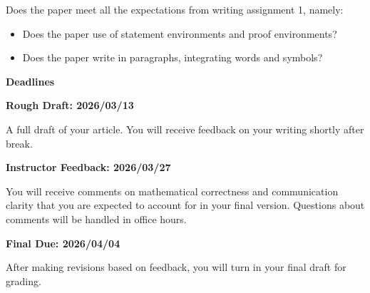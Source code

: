 \documentclass{article}
\begin{document}
\begin{itemize}
\begin{itemize}
                    Does the paper meet all the expectations
                    from writing assignment 1, namely:
                    \begin{itemize}
                        \item
                            Does the paper use of statement environments
                            and proof environments?
                        \item
                            Does the paper write in paragraphs,
                            integrating words and symbols?
                    \end{itemize}
            \end{itemize}
    \end{itemize}
    \par\hfill\par
    \textbf{\Large{Deadlines}}
    \par\hfill\par
    \textbf{Rough Draft: 2026/03/13}
    \par
    A full draft of your article.
    You will receive feedback on your writing shortly after break.
    \par\hfill\par
    \textbf{Instructor Feedback: 2026/03/27}
    \par
    You will receive comments on mathematical correctness and
    communication clarity that you are expected to account for in your
    final version. Questions about comments will be handled in office hours.
    \par\hfill\par
    \textbf{Final Due: 2026/04/04}
    \par
    After making revisions based on feedback,
    you will turn in your final draft for grading.
\end{document}
